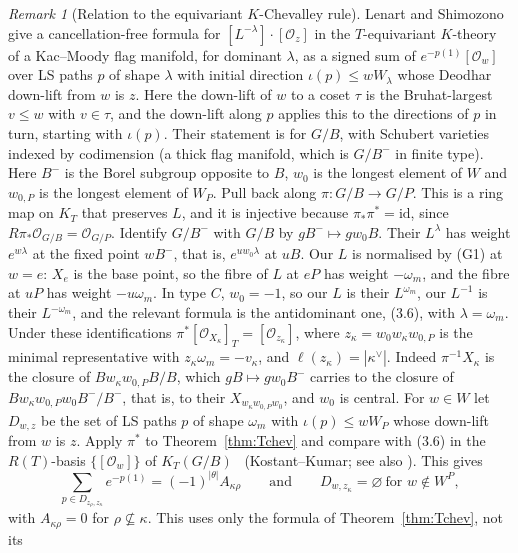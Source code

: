 \documentclass[11pt]{amsart}
\theoremstyle{definition}
\theoremstyle{remark}
\newtheorem{remark}[theorem]{Remark}
\newcommand{\cO}{\mathcal{O}}
\begin{document}
\begin{remark}[Relation to the equivariant $K$-Chevalley rule]\label{rem:LS12}
Lenart and Shimozono~\cite[Cor.~3.4, eq.~(3.6)]{LS12} give a cancellation-free formula for
$[L^{-\lambda}]\cdot[\cO_z]$ in the $T$-equivariant $K$-theory of a Kac--Moody flag manifold, for dominant
$\lambda$, as a signed sum of $e^{-p(1)}[\cO_w]$ over LS paths $p$ of shape $\lambda$ with initial direction
$\iota(p)\le wW_\lambda$ whose Deodhar down-lift from $w$ is $z$. Here the down-lift of $w$ to a coset $\tau$ is the
Bruhat-largest $v\le w$ with $v\in\tau$, and the down-lift along $p$ applies this to the directions of $p$ in turn,
starting with $\iota(p)$. Their statement is for $G/B$, with Schubert varieties indexed by codimension (a thick flag
manifold, which is $G/B^-$ in finite type). Here $B^-$ is the Borel subgroup opposite to $B$, $w_0$ is the longest
element of $W$ and $w_{0,P}$ is the longest element of $W_P$. Pull back along $\pi\colon G/B\to G/P$. This is a ring map on $K_T$
that preserves $L$, and it is injective because $\pi_*\pi^*=\mathrm{id}$, since $R\pi_*\cO_{G/B}=\cO_{G/P}$. Identify $G/B^-$ with $G/B$ by $gB^-\mapsto gw_0B$. Their $L^\lambda$ has weight $e^{w\lambda}$ at the fixed point
$wB^-$, that is, $e^{uw_0\lambda}$ at $uB$. Our $L$ is normalised by (G1) at $w=e$: $X_e$ is the base point, so the
fibre of $L$ at $eP$ has weight $-\omega_m$, and the fibre at $uP$ has weight $-u\omega_m$. In type $C$, $w_0=-1$, so
our $L$ is their $L^{\omega_m}$, our $L^{-1}$ is their $L^{-\omega_m}$, and the relevant formula is the antidominant
one, (3.6), with $\lambda=\omega_m$.
Under these identifications $\pi^*[\cO_{X_\kappa}]_T=[\cO_{z_\kappa}]$, where $z_\kappa=w_0w_\kappa w_{0,P}$ is the
minimal representative with $z_\kappa\omega_m=-v_\kappa$, and $\ell(z_\kappa)=|\kappa^\vee|$. Indeed
$\pi^{-1}X_\kappa$ is the closure of $Bw_\kappa w_{0,P}B/B$, which $gB\mapsto gw_0B^-$ carries to the closure of
$Bw_\kappa w_{0,P}w_0B^-/B^-$, that is, to their $X_{w_\kappa w_{0,P}w_0}$, and $w_0$ is central.
For $w\in W$ let $D_{w,z}$ be the set of LS paths $p$ of shape $\omega_m$ with $\iota(p)\le wW_P$ whose down-lift
from $w$ is $z$. Apply $\pi^*$ to Theorem~\ref{thm:Tchev} and compare with (3.6) in the $R(T)$-basis
$\{[\cO_w]\}$ of $K_T(G/B)$~\cite[(2.4)]{LS12} (Kostant--Kumar; see also \cite[Lemma~3.3]{Kumar17}). This gives
\[ \sum_{p\in D_{z_\rho,z_\kappa}}e^{-p(1)}=(-1)^{|\theta|}A_{\kappa\rho}\qquad\text{and}\qquad D_{w,z_\kappa}=\varnothing\ \text{for }w\notin W^P, \]
with $A_{\kappa\rho}=0$ for $\rho\not\subseteq\kappa$. This uses only the formula of Theorem~\ref{thm:Tchev}, not its

\end{remark}
\end{document}
